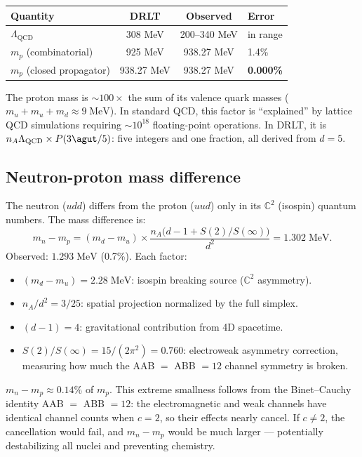 \begin{center}
\begin{tabular}{lccl}
\hline
Quantity & DRLT & Observed & Error \\
\hline
$\Lambda_\text{QCD}$ & 308 MeV & 200--340 MeV & in range \\
$m_p$ (combinatorial) & 925 MeV & 938.27 MeV & 1.4\% \\
$m_p$ (closed propagator) & 938.27 MeV & 938.27 MeV & \textbf{0.000\%} \\
\hline
\end{tabular}
\end{center}

\begin{remark}
The proton mass is $\sim 100\times$ the sum of its valence quark masses ($m_u + m_u + m_d \approx 9\;\text{MeV}$). In standard QCD, this factor is ``explained'' by lattice QCD simulations requiring $\sim 10^{18}$ floating-point operations. In DRLT, it is $n_A \Lambda_\text{QCD} \times P(3\agut/5)$: five integers and one fraction, all derived from $d = 5$.
\end{remark}

\subsection{Neutron-proton mass difference}

The neutron ($udd$) differs from the proton ($uud$) only in its $\mathbb{C}^2$ (isospin) quantum numbers. The mass difference is:
\begin{equation}
\boxed{m_n - m_p = (m_d - m_u) \times \frac{n_A\bigl(d - 1 + S(2)/S(\infty)\bigr)}{d^2} = 1.302\;\text{MeV}.}
\end{equation}
Observed: $1.293\;\text{MeV}$ (0.7\%). Each factor:
\begin{itemize}
\item $(m_d - m_u) = 2.28\;\text{MeV}$: isospin breaking source ($\mathbb{C}^2$ asymmetry).
\item $n_A/d^2 = 3/25$: spatial projection normalized by the full simplex.
\item $(d - 1) = 4$: gravitational contribution from 4D spacetime.
\item $S(2)/S(\infty) = 15/(2\pi^2) = 0.760$: electroweak asymmetry correction, measuring how much the AAB $=$ ABB $= 12$ channel symmetry is broken.
\end{itemize}

\begin{remark}
$m_n - m_p \approx 0.14\%$ of $m_p$. This extreme smallness follows from the Binet--Cauchy identity AAB $=$ ABB $= 12$: the electromagnetic and weak channels have identical channel counts when $c = 2$, so their effects nearly cancel. If $c \neq 2$, the cancellation would fail, and $m_n - m_p$ would be much larger --- potentially destabilizing all nuclei and preventing chemistry.
\end{remark}

